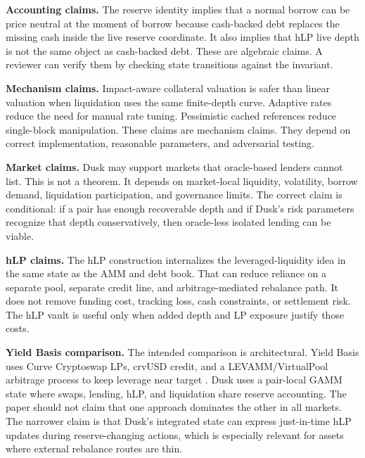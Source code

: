 \documentclass[11pt]{article}
\begin{document}
\textbf{Accounting claims.} The reserve identity implies that a normal borrow can be price neutral at the moment of borrow because cash-backed debt replaces the missing cash inside the live reserve coordinate. It also implies that hLP live depth is not the same object as cash-backed debt. These are algebraic claims. A reviewer can verify them by checking state transitions against the invariant.

\textbf{Mechanism claims.} Impact-aware collateral valuation is safer than linear valuation when liquidation uses the same finite-depth curve. Adaptive rates reduce the need for manual rate tuning. Pessimistic cached references reduce single-block manipulation. These claims are mechanism claims. They depend on correct implementation, reasonable parameters, and adversarial testing.

\textbf{Market claims.} Dusk may support markets that oracle-based lenders cannot list. This is not a theorem. It depends on market-local liquidity, volatility, borrow demand, liquidation participation, and governance limits. The correct claim is conditional: if a pair has enough recoverable depth and if Dusk's risk parameters recognize that depth conservatively, then oracle-less isolated lending can be viable.

\textbf{hLP claims.} The hLP construction internalizes the leveraged-liquidity idea in the same state as the AMM and debt book. That can reduce reliance on a separate pool, separate credit line, and arbitrage-mediated rebalance path. It does not remove funding cost, tracking loss, cash constraints, or settlement risk. The hLP vault is useful only when added depth and LP exposure justify those costs.

\textbf{Yield Basis comparison.} The intended comparison is architectural. Yield Basis uses Curve Cryptoswap LPs, crvUSD credit, and a LEVAMM/VirtualPool arbitrage process to keep leverage near target \cite{egorov-yieldbasis-whitepaper,yieldbasis-technical}. Dusk uses a pair-local GAMM state where swaps, lending, hLP, and liquidation share reserve accounting. The paper should not claim that one approach dominates the other in all markets. The narrower claim is that Dusk's integrated state can express just-in-time hLP updates during reserve-changing actions, which is especially relevant for assets where external rebalance routes are thin.
\end{document}
